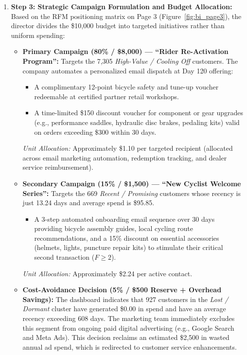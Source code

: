 \begin{enumerate}
    \item \textbf{Step 3: Strategic Campaign Formulation and Budget Allocation:}
    Based on the RFM positioning matrix on Page 3 (Figure~\ref{fig:bi_page3}), the director divides the \$10,000 budget into targeted initiatives rather than uniform spending:
    \begin{itemize}
        \item \textbf{Primary Campaign (80\% / \$8,000) --- ``Rider Re-Activation Program'':} Targets the 7,305 \textit{High-Value / Cooling Off} customers. The company automates a personalized email dispatch at Day 120 offering:
        \begin{itemize}
            \item A complimentary 12-point bicycle safety and tune-up voucher redeemable at certified partner retail workshops.
            \item A time-limited \$150 discount voucher for component or gear upgrades (e.g., performance saddles, hydraulic disc brakes, pedaling kits) valid on orders exceeding \$300 within 30 days.
        \end{itemize}
        \textit{Unit Allocation:} Approximately \$1.10 per targeted recipient (allocated across email marketing automation, redemption tracking, and dealer service reimbursement).
        
        \item \textbf{Secondary Campaign (15\% / \$1,500) --- ``New Cyclist Welcome Series'':} Targets the 669 \textit{Recent / Promising} customers whose recency is just 13.24 days and average spend is \$95.85.
        \begin{itemize}
            \item A 3-step automated onboarding email sequence over 30 days providing bicycle assembly guides, local cycling route recommendations, and a 15\% discount on essential accessories (helmets, lights, puncture repair kits) to stimulate their critical second transaction ($F \ge 2$).
        \end{itemize}
        \textit{Unit Allocation:} Approximately \$2.24 per active contact.

        \item \textbf{Cost-Avoidance Decision (5\% / \$500 Reserve + Overhead Savings):}
        The dashboard indicates that 927 customers in the \textit{Lost / Dormant} cluster have generated \$0.00 in spend and have an average recency exceeding 608 days. The marketing team immediately excludes this segment from ongoing paid digital advertising (e.g., Google Search and Meta Ads). This decision reclaims an estimated \$2,500 in wasted annual ad spend, which is redirected to customer service enhancements.
    \end{itemize}


\end{enumerate}
